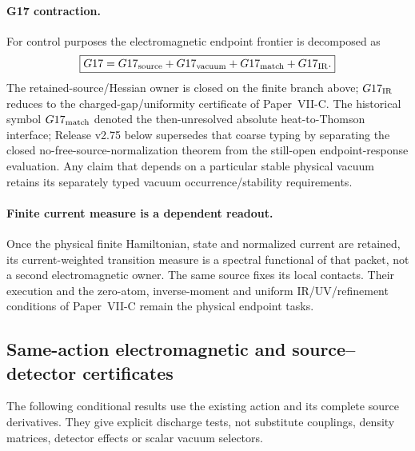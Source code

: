 \documentclass[12pt,a4paper]{article}
\begin{document}
\paragraph{G17 contraction.}
For control purposes the electromagnetic endpoint frontier is decomposed as
\[
 \boxed{G17=G17_{\rm source}+G17_{\rm vacuum}+G17_{\rm match}+G17_{\rm IR}.}
\]
The retained-source/Hessian owner is closed on the finite branch above;
$G17_{\rm IR}$ reduces to the charged-gap/uniformity certificate of Paper~VII-C.
The historical symbol $G17_{\rm match}$ denoted the then-unresolved absolute
heat-to-Thomson interface; Release v2.75 below supersedes that coarse typing by
separating the closed no-free-source-normalization theorem from the still-open
endpoint-response evaluation.  Any claim that depends on a particular stable
physical vacuum retains its separately typed vacuum occurrence/stability
requirements.
\paragraph{Finite current measure is a dependent readout.}
Once the physical finite Hamiltonian, state and normalized current are
retained, its current-weighted transition measure is a spectral functional of
that packet, not a second electromagnetic owner.  The same source fixes its
local contacts.  Their execution and the zero-atom, inverse-moment and uniform
IR/UV/refinement conditions of Paper~VII-C remain the physical endpoint tasks.



\subsection{Same-action electromagnetic and source--detector certificates}
\label{p5c:sec:v2210-lit-observable-certificates}
The following conditional results use the existing action and its complete
source derivatives.  They give explicit discharge tests, not substitute
couplings, density matrices, detector effects or scalar vacuum selectors.
\end{document}
